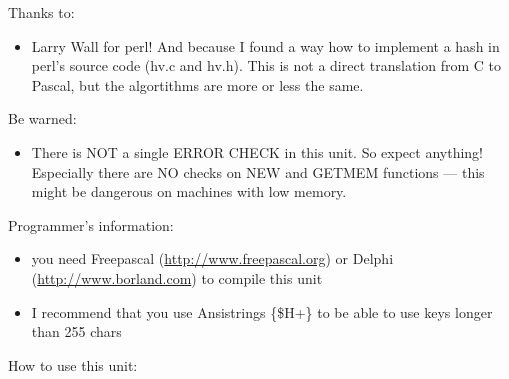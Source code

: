 \documentclass{report}
\begin{document}
Thanks to: \begin{itemize}
\item Larry Wall for perl! And because I found a way how to implement a hash in perl's source code (hv.c and hv.h). This is not a direct translation from C to Pascal, but the algortithms are more or less the same.
\end{itemize}

Be warned: \begin{itemize}
\item There is NOT a single ERROR CHECK in this unit. So expect anything! Especially there are NO checks on NEW and GETMEM functions --- this might be dangerous on machines with low memory.
\end{itemize}

Programmer's information: \begin{itemize}
\item you need Freepascal (\href{http://www.freepascal.org}{http://www.freepascal.org}) or Delphi (\href{http://www.borland.com}{http://www.borland.com}) to compile this unit
\item I recommend that you use Ansistrings {\{}{\$}H+{\}} to be able to use keys longer than 255 chars
\end{itemize}

How to use this unit:
\end{document}
